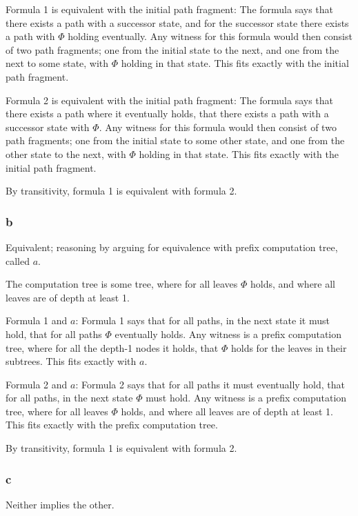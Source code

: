 Formula 1 is equivalent with the initial path fragment:
The formula says that there exists a path with a successor state,
and for the successor state there exists a path with $\Phi$
holding eventually.
Any witness for this formula would then consist of two path fragments;
one from the initial state to the next, and one from the next
to some state, with $\Phi$ holding in that state.
This fits exactly with the initial path fragment.

Formula 2 is equivalent with the initial path fragment:
The formula says that there exists a path where it eventually holds,
that there exists a path with a successor state with $\Phi$.
Any witness for this formula would then consist of two path fragments;
one from the initial state to some other state,
and one from the other state to the next, with $\Phi$ holding in that state.
This fits exactly with the initial path fragment.

By transitivity, formula 1 is equivalent with formula 2.

\subsubsection{b}

Equivalent; reasoning by arguing for equivalence with prefix computation tree, called $a$.

The computation tree is some tree, where for all leaves $\Phi$ holds,
and where all leaves are of depth at least 1.

Formula 1 and $a$:
Formula 1 says that for all paths, in the next state it must hold,
that for all paths $\Phi$ eventually holds.
Any witness is a prefix computation tree,
where for all the depth-1 nodes it holds,
that $\Phi$ holds for the leaves in their subtrees.
This fits exactly with $a$.

Formula 2 and $a$:
Formula 2 says that for all paths it must eventually hold,
that for all paths, in the next state $\Phi$ must hold.
Any witness is a prefix computation tree,
where for all leaves $\Phi$ holds,
and where all leaves are of depth at least 1.
This fits exactly with the prefix computation tree.

By transitivity, formula 1 is equivalent with formula 2.

\subsubsection{c}

Neither implies the other.


